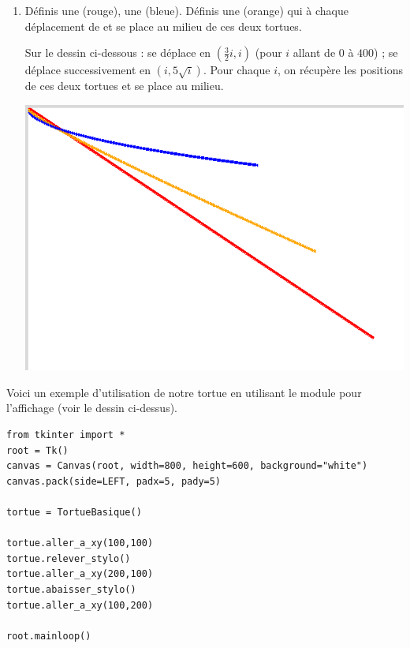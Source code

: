 \documentclass[11pt,class=report,crop=false]{standalone}
\begin{document}
\begin{activite}
\begin{enumerate}
  \item Définis une  (rouge), une  (bleue).
  Définis une  (orange) qui à chaque déplacement de
   et  se place au milieu de ces deux tortues.
  
  Sur le dessin ci-dessous :  se déplace en $(\frac32i,i)$ (pour 
  $i$ allant de $0$ à $400$) ;  se déplace successivement en $(i,5\sqrt{i})$.
  Pour chaque $i$, on récupère les positions de ces deux tortues et  se place au milieu.
 
  
\begin{center}
\includegraphics[scale=\myscale,scale=0.4]{ecran-tortue-2}
\end{center}	    

\end{enumerate}

Voici un exemple d'utilisation de notre tortue en utilisant le module  pour l'affichage (voir le dessin ci-dessus).
\begin{lstlisting}
from tkinter import *
root = Tk()      
canvas = Canvas(root, width=800, height=600, background="white")
canvas.pack(side=LEFT, padx=5, pady=5)

tortue = TortueBasique()

tortue.aller_a_xy(100,100)
tortue.relever_stylo()
tortue.aller_a_xy(200,100)
tortue.abaisser_stylo()
tortue.aller_a_xy(100,200)

root.mainloop()
\end{lstlisting}


\end{activite}
\end{document}

